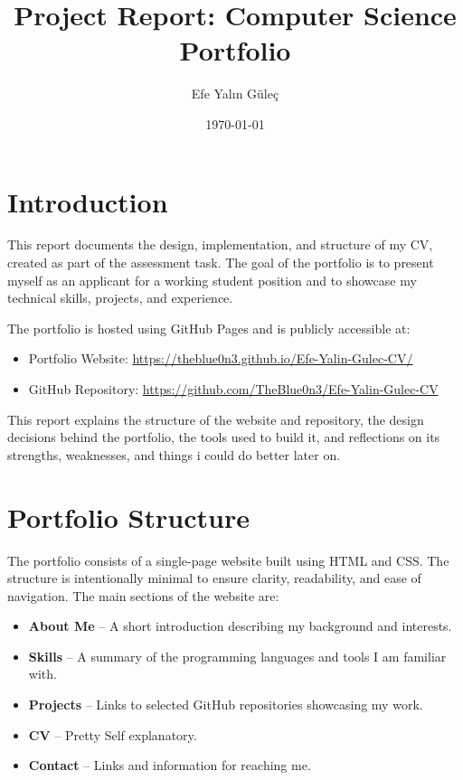 \documentclass[12pt]{article}
\title{Project Report: Computer Science Portfolio}
\author{Efe Yalın Güleç}
\date{\today}
\begin{document}
\maketitle

\section{Introduction}

This report documents the design, implementation, and structure of my CV, created as part of the assessment task. The goal of the portfolio is to present myself as an applicant for a working student position and to showcase my technical skills, projects, and experience.

The portfolio is hosted using GitHub Pages and is publicly accessible at:

\begin{itemize}
    \item Portfolio Website: \url{https://theblue0n3.github.io/Efe-Yalin-Gulec-CV/}
    \item GitHub Repository: \url{https://github.com/TheBlue0n3/Efe-Yalin-Gulec-CV}
\end{itemize}

This report explains the structure of the website and repository, the design decisions behind the portfolio, the tools used to build it, and reflections on its strengths, weaknesses, and things i could do better later on.

\section{Portfolio Structure}

The portfolio consists of a single-page website built using HTML and CSS. The structure is intentionally minimal to ensure clarity, readability, and ease of navigation. The main sections of the website are:

\begin{itemize}
    \item \textbf{About Me} – A short introduction describing my background and interests.
    \item \textbf{Skills} – A summary of the programming languages and tools I am familiar with.
    \item \textbf{Projects} – Links to selected GitHub repositories showcasing my work.
    \item \textbf{CV} – Pretty Self explanatory.
    \item \textbf{Contact} – Links and information for reaching me.
\end{itemize}
\end{document}

